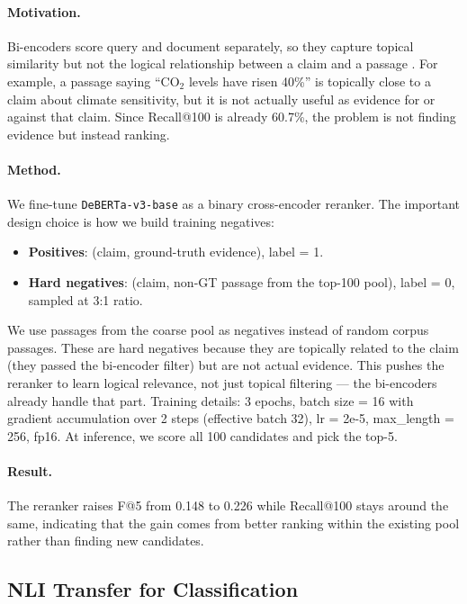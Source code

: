 \documentclass[11pt]{article}
\begin{document}
\paragraph{Motivation.}
Bi-encoders score query and document separately, so they capture
topical similarity but not the logical relationship between a claim
and a passage \citep{nogueira-cho-2019-passage}.
For example, a passage saying ``CO$_2$ levels have risen 40\%'' is
topically close to a claim about climate sensitivity, but it is not
actually useful as evidence for or against that claim.
Since Recall@100 is already 60.7\%, the problem is not finding
evidence but instead ranking.

\paragraph{Method.}
We fine-tune \texttt{DeBERTa-v3-base} \citep{he-etal-2021-deberta} as
a binary cross-encoder reranker.
The important design choice is how we build training negatives:
\begin{itemize}
  \item \textbf{Positives}: (claim, ground-truth evidence), label = 1.
  \item \textbf{Hard negatives}: (claim, non-GT passage from the top-100
        pool), label = 0, sampled at 3:1 ratio.
\end{itemize}
We use passages from the coarse pool as negatives instead of random
corpus passages.
These are hard negatives because they are topically related to the
claim (they passed the bi-encoder filter) but are not actual evidence.
This pushes the reranker to learn logical relevance, not just topical
filtering --- the bi-encoders already handle that part.
Training details: 3 epochs, batch size = 16 with gradient accumulation
over 2 steps (effective batch 32), lr = 2e-5, max\_length = 256, fp16.
At inference, we score all 100 candidates and pick the top-5.

\paragraph{Result.}
The reranker raises F@5 from 0.148 to 0.226 while
Recall@100 stays around the same, indicating that the gain comes from
better ranking within the existing pool rather than finding new
candidates.

\subsection{NLI Transfer for Classification}
\label{sec:nli-transfer}
\end{document}
